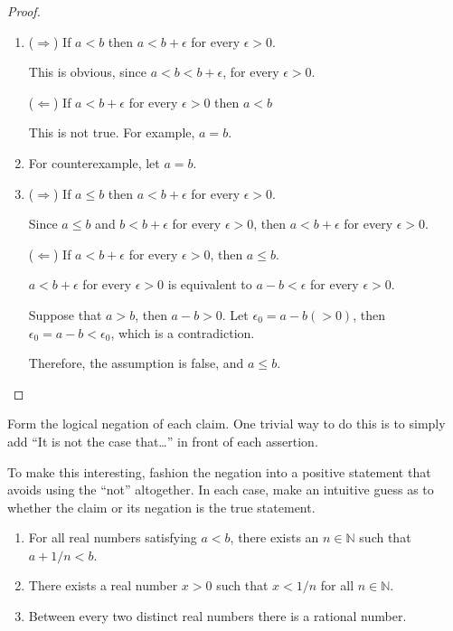 \documentclass[class=understanding-analysis,crop=false]{standalone}
\begin{document}
\begin{proof}
    \begin{enumerate}[label = (\alph*)]
        \item ($\Rightarrow$) If $a < b$ then $a < b + \epsilon$ for every $\epsilon > 0$.
              \par This is obvious, since $a < b < b + \epsilon$, for every $\epsilon > 0$.
              \par ($\Leftarrow$) If $a < b + \epsilon$ for every $\epsilon > 0$ then $a < b$
              \par This is not true. For example, $a = b$.
        \item For counterexample, let $a = b$.
        \item ($\Rightarrow$) If $a \le b$ then $a < b + \epsilon$ for every $\epsilon > 0$.
              \par Since $a \le b$ and $b < b + \epsilon$ for every $\epsilon > 0$, then $a < b + \epsilon$ for every $\epsilon > 0$.
              \par ($\Leftarrow$) If $a < b + \epsilon$ for every $\epsilon > 0$, then $a\le b$.
              \par $a < b + \epsilon$ for every $\epsilon > 0$ is equivalent to $a - b < \epsilon$ for every $\epsilon > 0$.
              \par Suppose that $a > b$, then $a - b > 0$. Let $\epsilon_{0} = a - b (>0)$, then $\epsilon_{0} = a - b < \epsilon_{0}$, which is a contradiction.
              \par Therefore, the assumption is false, and $a \le b$.
    \end{enumerate}
\end{proof}

\begin{exercise}
    \par Form the logical negation of each claim. One trivial way to do this is to simply add ``It is not the case that\ldots'' in front of each assertion.
    \par To make this interesting, fashion the negation into a positive statement that avoids using the ``not'' altogether. In each case, make an intuitive guess as to whether the claim or its negation is the true statement.
    \begin{enumerate}[label = (\alph*)]
        \item For all real numbers satisfying $a < b$, there exists an $n \in \mathbb{N}$ such that $a + 1/n < b$.
        \item There exists a real number $x > 0$ such that $x < 1/n$ for all $n \in \mathbb{N}$.
        \item Between every two distinct real numbers there is a rational number.
    \end{enumerate}
\end{exercise}
\end{document}
